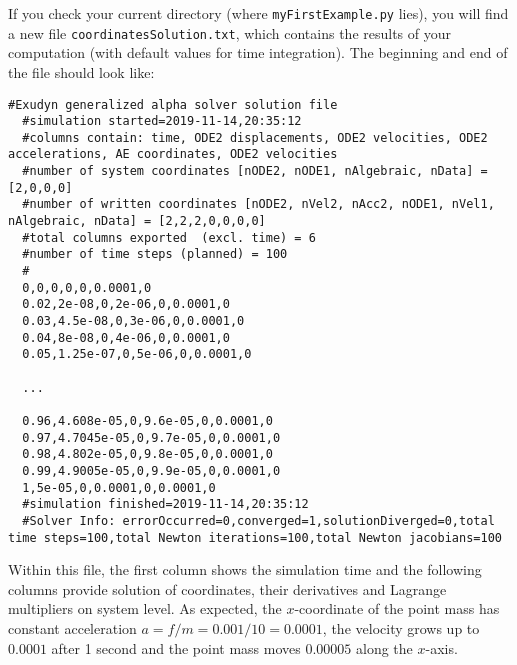 If you check your current directory (where \texttt{myFirstExample.py} lies), you will find a new file \texttt{coordinatesSolution.txt}, which contains the results of your computation (with default values for time integration).
The beginning and end of the file should look like: \vspace{6pt}\\
{\ttfamily \footnotesize
\begin{lstlisting}[breaklines=true]
  #Exudyn generalized alpha solver solution file
  #simulation started=2019-11-14,20:35:12
  #columns contain: time, ODE2 displacements, ODE2 velocities, ODE2 accelerations, AE coordinates, ODE2 velocities
  #number of system coordinates [nODE2, nODE1, nAlgebraic, nData] = [2,0,0,0]
  #number of written coordinates [nODE2, nVel2, nAcc2, nODE1, nVel1, nAlgebraic, nData] = [2,2,2,0,0,0,0]
  #total columns exported  (excl. time) = 6
  #number of time steps (planned) = 100
  #
  0,0,0,0,0,0.0001,0
  0.02,2e-08,0,2e-06,0,0.0001,0
  0.03,4.5e-08,0,3e-06,0,0.0001,0
  0.04,8e-08,0,4e-06,0,0.0001,0
  0.05,1.25e-07,0,5e-06,0,0.0001,0

  ...

  0.96,4.608e-05,0,9.6e-05,0,0.0001,0
  0.97,4.7045e-05,0,9.7e-05,0,0.0001,0
  0.98,4.802e-05,0,9.8e-05,0,0.0001,0
  0.99,4.9005e-05,0,9.9e-05,0,0.0001,0
  1,5e-05,0,0.0001,0,0.0001,0
  #simulation finished=2019-11-14,20:35:12
  #Solver Info: errorOccurred=0,converged=1,solutionDiverged=0,total time steps=100,total Newton iterations=100,total Newton jacobians=100
\end{lstlisting}
}

Within this file, the first column shows the simulation time and the following columns provide solution of coordinates, their derivatives and Lagrange multipliers on system level. As expected, the $x$-coordinate of the point mass has constant acceleration $a=f/m=0.001/10=0.0001$, the velocity grows up to $0.0001$ after 1 second and the point mass moves $0.00005$ along the $x$-axis.
%
\newpage
{}


